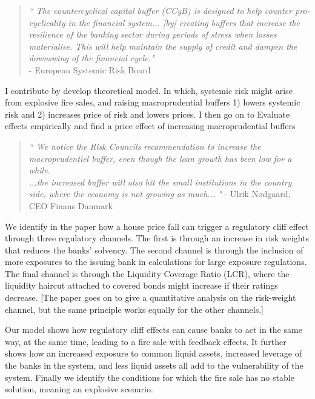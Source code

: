 \documentclass[11pt]{article}
\begin{document}
\begin{quote}\textit{``
The countercyclical capital buffer (CCyB) is designed to help counter pro-cyclicality in the financial system... [by] creating buffers that increase the resilience of the banking sector during periods of stress when losses materialise. This will help maintain the supply of credit and dampen the downswing of the financial cycle."}\\
\hspace{1em}- {European Systemic Risk Board}
\end{quote}

I contribute by develop theoretical model. In which, systemic risk might arise from explosive fire sales, and raising macroprudential buffers 1) lowers systemic risk and 2) increases price of risk and lowers prices. I then go on to Evaluate effects empirically and find a price effect of increasing macroprudential buffers

\begin{quote}\textit{``
We notice the Risk Councils recommendation to increase the macroprudentiel buffer, even though the loan growth has been low for a while.\\ ...the increased buffer will also hit the small institutions in the country side, where the economy is not growing as much...
"}
- {Ulrik Nødgaard, CEO Finans Danmark}
\end{quote}

We identify in the paper how a house price fall can trigger a regulatory cliff effect through three regulatory channels. The first is through an increase in risk weights that reduces the banks' solvency. The second channel is through the inclusion of more exposures to the issuing bank in calculations for large exposure regulations. The final channel is through the Liquidity Coverage Ratio (LCR), where the liquidity haircut attached to covered bonds might increase if their ratings decrease. [The paper goes on to give a quantitative analysis on the risk-weight channel, but the same principle works equally for the other channels.]

Our model shows how regulatory cliff effects can cause banks to act in the same way, at the same time, leading to a fire sale with feedback effects. It further shows how an increased exposure to common liquid assets, increased leverage of the banks in the system, and less liquid assets all add to the vulnerability of the system. Finally we identify the conditions for which the fire sale has no stable solution, meaning an explosive scenario.
\end{document}
